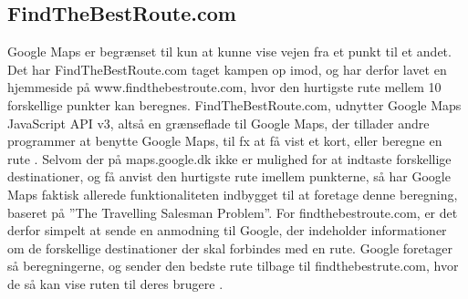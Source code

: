 \subsection{FindTheBestRoute.com}
Google Maps er begrænset til kun at kunne vise vejen fra et punkt til et andet. Det har FindTheBestRoute.com taget kampen op imod, og har derfor lavet en hjemmeside på www.findthebestroute.com, hvor den hurtigste rute mellem 10 forskellige punkter kan beregnes. FindTheBestRoute.com, udnytter Google Maps JavaScript API v3, altså en grænseflade til Google Maps, der tillader andre programmer at benytte Google Maps, til fx at få vist et kort, eller beregne en rute \citep{ftbr}.\newline
Selvom der på maps.google.dk ikke er mulighed for at indtaste forskellige destinationer, og få anvist den hurtigste rute imellem punkterne, så har Google Maps faktisk allerede funktionaliteten indbygget til at foretage denne beregning, baseret på ”The Travelling Salesman Problem”.\newline
For findthebestroute.com, er det derfor simpelt at sende en anmodning til Google, der indeholder informationer om de forskellige destinationer der skal forbindes med en rute. Google foretager så beregningerne, og sender den bedste rute tilbage til findthebestrute.com, hvor de så kan vise ruten til deres brugere \citep{googleapi}. \newline
